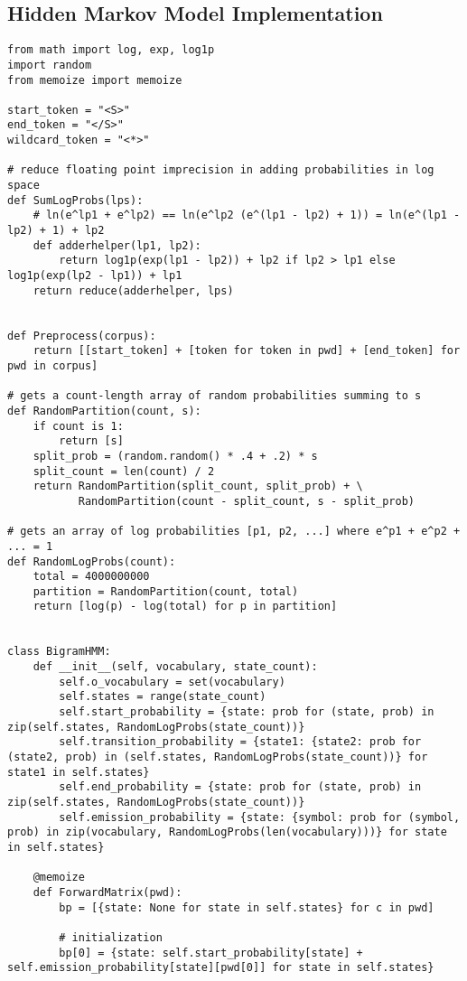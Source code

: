 \documentclass{amsart}
\theoremstyle{definition}
\theoremstyle{remark}
\numberwithin{equation}{section}
\begin{document}
\subsection{Hidden Markov Model Implementation}
\begin{lstlisting}
from math import log, exp, log1p
import random
from memoize import memoize

start_token = "<S>"
end_token = "</S>"
wildcard_token = "<*>"

# reduce floating point imprecision in adding probabilities in log space
def SumLogProbs(lps):
    # ln(e^lp1 + e^lp2) == ln(e^lp2 (e^(lp1 - lp2) + 1)) = ln(e^(lp1 - lp2) + 1) + lp2
    def adderhelper(lp1, lp2):
        return log1p(exp(lp1 - lp2)) + lp2 if lp2 > lp1 else log1p(exp(lp2 - lp1)) + lp1
    return reduce(adderhelper, lps)


def Preprocess(corpus):
    return [[start_token] + [token for token in pwd] + [end_token] for pwd in corpus]

# gets a count-length array of random probabilities summing to s
def RandomPartition(count, s):
    if count is 1:
        return [s]
    split_prob = (random.random() * .4 + .2) * s
    split_count = len(count) / 2
    return RandomPartition(split_count, split_prob) + \
           RandomPartition(count - split_count, s - split_prob)

# gets an array of log probabilities [p1, p2, ...] where e^p1 + e^p2 + ... = 1
def RandomLogProbs(count):
    total = 4000000000
    partition = RandomPartition(count, total)
    return [log(p) - log(total) for p in partition]


class BigramHMM:
    def __init__(self, vocabulary, state_count):
        self.o_vocabulary = set(vocabulary)
        self.states = range(state_count)
        self.start_probability = {state: prob for (state, prob) in zip(self.states, RandomLogProbs(state_count))}
        self.transition_probability = {state1: {state2: prob for (state2, prob) in (self.states, RandomLogProbs(state_count))} for state1 in self.states}
        self.end_probability = {state: prob for (state, prob) in zip(self.states, RandomLogProbs(state_count))}
        self.emission_probability = {state: {symbol: prob for (symbol, prob) in zip(vocabulary, RandomLogProbs(len(vocabulary)))} for state in self.states}

    @memoize
    def ForwardMatrix(pwd):
        bp = [{state: None for state in self.states} for c in pwd]

        # initialization
        bp[0] = {state: self.start_probability[state] + self.emission_probability[state][pwd[0]] for state in self.states}


\end{lstlisting}
\end{document}
